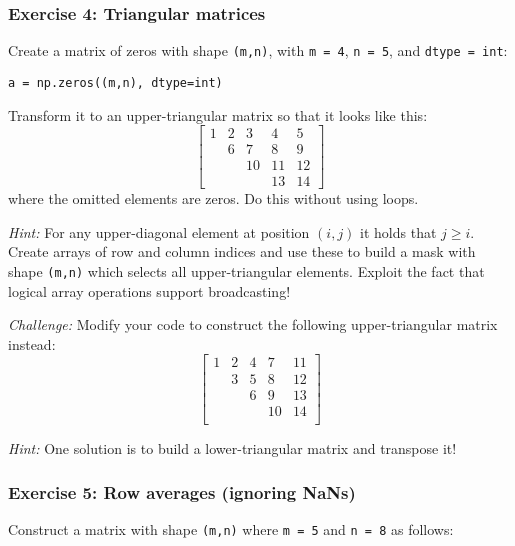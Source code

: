\documentclass{scrartcl}
\begin{document}
    \hypertarget{exercise-4-triangular-matrices}{%
\subsubsection{Exercise 4: Triangular
matrices}\label{exercise-4-triangular-matrices}}

Create a matrix of zeros with shape \texttt{(m,n)}, with
\texttt{m\ =\ 4}, \texttt{n\ =\ 5}, and \texttt{dtype\ =\ int}:

\begin{verbatim}
a = np.zeros((m,n), dtype=int)
\end{verbatim}

Transform it to an upper-triangular matrix so that it looks like this:
\[
\begin{bmatrix}
1 & 2 & 3 & 4 & 5 \\
 & 6 & 7 & 8 & 9 \\
  & & 10 & 11 & 12 \\
  & & & 13 & 14
\end{bmatrix}
\] where the omitted elements are zeros. Do this without using loops.

\emph{Hint:} For any upper-diagonal element at position \((i,j)\) it
holds that \(j \geq i\). Create arrays of row and column indices and use
these to build a mask with shape \texttt{(m,n)} which selects all
upper-triangular elements. Exploit the fact that logical array
operations support broadcasting!

\emph{Challenge:} Modify your code to construct the following
upper-triangular matrix instead: \[
\begin{bmatrix}
1 & 2 & 4 & 7 & 11 \\
  & 3 & 5 & 8 & 12 \\
  &   & 6 & 9 & 13 \\
  &   &   & 10 & 14 \\
\end{bmatrix}
\]

\emph{Hint:} One solution is to build a lower-triangular matrix and
transpose it!

    \hypertarget{exercise-5-row-averages-ignoring-nans}{%
\subsubsection{Exercise 5: Row averages (ignoring
NaNs)}\label{exercise-5-row-averages-ignoring-nans}}

Construct a matrix with shape \texttt{(m,n)} where \texttt{m\ =\ 5} and
\texttt{n\ =\ 8} as follows:
\end{document}
